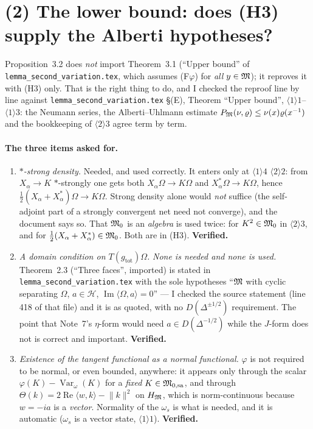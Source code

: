 \documentclass[11pt]{article}
\newcommand{\ip}[2]{\langle#1,#2\rangle}
\newcommand{\norm}[1]{\lVert#1\rVert}
\newcommand{\HM}{H_{\cM}}
\newcommand{\Var}{\operatorname{Var}}
\newcommand{\Hil}{\mathcal H}
\newcommand{\Om}{\Omega}
\newcommand{\gtot}{g_{\mathrm{tot}}}
\begin{document}
\section{(2) The lower bound: does (H3) supply the Alberti hypotheses?}\label{r:lower}

Proposition~3.2 does \emph{not} import Theorem~3.1 (``Upper bound'' of
\texttt{lemma\_second\_variation.tex}, which assumes (F$\varphi$) for \emph{all} $y\in\mathfrak M$); it reproves it
with (H3) only.  That is the right thing to do, and I checked the reproof line by line against
\texttt{lemma\_second\_variation.tex} \S(E), Theorem ``Upper bound'', $\langle1\rangle1$--$\langle1\rangle3$:
the Neumann series, the Alberti--Uhlmann estimate $P_\mathfrak M(\nu,\varrho)\le\nu(x)\varrho(x^{-1})$ and the
bookkeeping of $\langle2\rangle3$ agree term by term.

\paragraph{The three items asked for.}
\begin{enumerate}[leftmargin=1.9em]
\item \emph{$*$-strong density.}  Needed, and used correctly.  It enters only at $\langle1\rangle4$
 $\langle2\rangle2$: from $X_\alpha\to K$ $*$-strongly one gets both $X_\alpha\Om\to K\Om$ and
 $X_\alpha^*\Om\to K\Om$, hence $\frac12(X_\alpha+X_\alpha^*)\Om\to K\Om$.  Strong density alone would
 \emph{not} suffice (the self-adjoint part of a strongly convergent net need not converge), and the document
 says so.  That $\mathfrak M_0$ is an \emph{algebra} is used twice: for $K^2\in\mathfrak M_0$ in $\langle2\rangle3$, and for
 $\frac12(X_\alpha+X^*_\alpha)\in\mathfrak M_0$.  Both are in (H3).  \textbf{Verified.}
\item \emph{A domain condition on $T(\gtot)\Om$.}  \emph{None is needed and none is used.}  Theorem~2.3
 (``Three faces'', imported) is stated in \texttt{lemma\_second\_variation.tex} with the sole hypotheses
 ``$\mathfrak M$ with cyclic separating $\Om$, $a\in\Hil$, $\operatorname{Im}\ip\Om a=0$'' --- I checked the source
 statement (line 418 of that file) and it is as quoted, with no $D(\Delta^{\pm1/2})$ requirement.
 The point that Note~7's $\eta$-form would need $a\in D(\Delta^{-1/2})$ while the $J$-form does not is
 correct and important.  \textbf{Verified.}
\item \emph{Existence of the tangent functional as a normal functional.}  $\varphi$ is not required to be
 normal, or even bounded, anywhere: it appears only through the scalar
 $\varphi(K)-\Var_\omega(K)$ for a \emph{fixed} $K\in\mathfrak M_{0,\mathrm{sa}}$, and through
 $\Theta(k)=2\operatorname{Re}\ip wk-\norm k^2$ on $\HM$, which is norm-continuous because $w=-ia$ is a
 \emph{vector}.  Normality of the $\omega_s$ is what is needed, and it is automatic
 ($\omega_s$ is a vector state, $\langle1\rangle1$).  \textbf{Verified.}
\end{enumerate}
\end{document}
